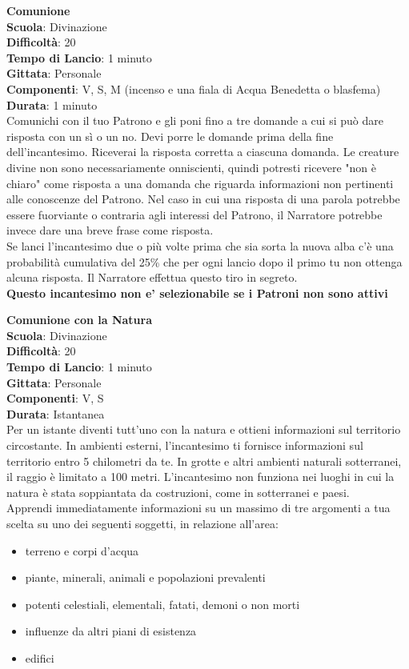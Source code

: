 \begin{multicols}{2}
\medskip\textbf{Comunione}\\
\textbf{Scuola}: Divinazione\\
\textbf{Difficoltà}: 20\\
\textbf{Tempo di Lancio}: 1 minuto\\
\textbf{Gittata}: Personale\\
\textbf{Componenti}: V, S, M (incenso e una fiala di Acqua Benedetta o blasfema)\\
\textbf{Durata}: 1 minuto\\
Comunichi con il tuo Patrono e gli poni fino a tre domande a cui si può dare risposta con un sì o un no. Devi porre le domande prima della fine dell'incantesimo. Riceverai la risposta corretta a ciascuna domanda. Le creature divine non sono necessariamente onniscienti, quindi potresti ricevere "non è chiaro" come risposta a una domanda che riguarda informazioni non pertinenti alle conoscenze del Patrono. Nel caso in cui una risposta di una parola potrebbe essere fuorviante o contraria agli interessi del Patrono, il Narratore potrebbe invece dare una breve frase come risposta.\\
Se lanci l'incantesimo due o più volte prima che sia sorta la nuova alba c'è una probabilità cumulativa del 25\% che per ogni lancio dopo il primo tu non ottenga alcuna risposta. Il Narratore effettua questo tiro in segreto.\\
\textbf{Questo incantesimo non e' selezionabile se i Patroni non sono attivi}

\medskip\textbf{Comunione con la Natura}\\
\textbf{Scuola}: Divinazione\\
\textbf{Difficoltà}: 20\\
\textbf{Tempo di Lancio}: 1 minuto\\
\textbf{Gittata}: Personale\\
\textbf{Componenti}: V, S\\
\textbf{Durata}: Istantanea\\
Per un istante diventi tutt'uno con la natura e ottieni informazioni sul territorio circostante. In ambienti esterni, l'incantesimo ti fornisce informazioni sul territorio entro 5 chilometri da te. In grotte e altri ambienti naturali sotterranei, il raggio è limitato a 100 metri. L'incantesimo non funziona nei luoghi in cui la natura è stata soppiantata da costruzioni, come in sotterranei e paesi.\\
Apprendi immediatamente informazioni su un massimo di tre argomenti a tua scelta su uno dei seguenti soggetti, in relazione all'area:
\begin{itemize}
	\item 
	terreno e corpi d'acqua
	\item 
	piante, minerali, animali e popolazioni prevalenti
	\item 
  potenti celestiali, elementali, fatati, demoni o non morti
	\item 
  influenze da altri piani di esistenza
	\item
  edifici
\end{itemize}


\end{multicols}
